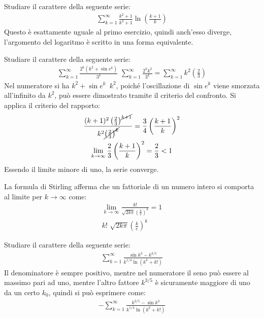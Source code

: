\documentclass{article}
\numberwithin{equation}{subsection}
\begin{document}
Studiare il carattere della seguente serie:
\begin{gather*}
    \displaystyle\sum_{k=1}^\infty\frac{k^2+1}{k^3+1}\ln\left(\frac{k+1}{k}\right)
\end{gather*}
Questo è esattamente uguale al primo esercizio, quindi anch'esso diverge, l'argomento del logaritmo è scritto in una forma equivalente. 


Studiare il carattere della seguente serie:
\begin{gather*}
    \displaystyle\sum_{k=1}^\infty\frac{2^k(k^2+\sin e^k)}{3^k}\mbox{~}
    \displaystyle\sum_{k=1}^\infty\frac{2^kk^2}{3^k}=
    \displaystyle\sum_{k=1}^\infty k^2\left(\frac{2}{3}\right)
\end{gather*}
Nel numeratore si ha $k^2+\sin e^k$~$k^2$, poiché l'oscillazione di $\sin e^k$ viene smorzata all'infinito da $k^2$, può essere dimostrato tramite il criterio del confronto. 
Si applica il criterio del rapporto:
\begin{gather*}
    \displaystyle\frac{(k+1)^2\left(\frac{2}{3}\right)^{\cancel{k+1}}}{k^2\cancel{\left(\frac{2}{3}\right)^k}}=\frac{3}{4}\left(\frac{k+1}{k}\right)^2\\
    \lim_{k\to\infty}\frac{2}{3}\left(\frac{k+1}{k}\right)^2=\frac{2}{3}<1
\end{gather*}
Essendo il limite minore di uno, la serie converge. 


La formula di Stirling afferma che un fattoriale di un numero intero si comporta al limite per $k\to\infty$ come:
\begin{gather*}
    \displaystyle\lim_{k\to\infty}\frac{k!}{\sqrt{2k\pi}\left(\frac{k}{e}\right)^k}=1\\
    k!\mbox{~}\sqrt{2k\pi}\left(\frac{k}{e}\right)^k
\end{gather*}



Studiare il carattere della seguente serie:
\begin{gather*}
    \displaystyle\sum_{k=1}^\infty\frac{\sin k^3-k^{3/5}}{k^{1/4}\ln(k^k+k!)}
\end{gather*}
Il denominatore è sempre positivo, mentre nel numeratore il seno può essere al massimo pari ad uno, mentre l'altro fattore $k^{3/5}$ è sicuramente maggiore di uno da un certo $k_0$, quindi si può esprimere come:
\begin{gather*}
    -\displaystyle\sum_{k=1}^\infty\frac{k^{3/5}-\sin k^3}{k^{1/4}\ln(k^k+k!)}
\end{gather*}
\end{document}
